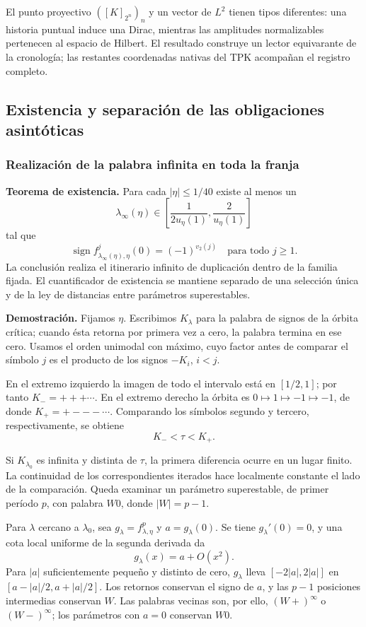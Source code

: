 El punto proyectivo \(([K]_{2^n})_n\) y un vector de \(L^2\) tienen tipos diferentes: una historia puntual induce una Dirac, mientras las amplitudes normalizables pertenecen al espacio de Hilbert. El resultado construye un lector equivarante de la cronología; las restantes coordenadas nativas del TPK acompañan el registro completo.


\subsection{Existencia y separación de las obligaciones asintóticas}
\label{hmtfg:prolongacion:6}

\subsubsection{Realización de la palabra infinita en toda la franja}
\label{hmtfg:prolongacion:6.1}

\textbf{Teorema de existencia.} Para cada \(|\eta|\le1/40\) existe al menos un
\[
\lambda_\infty(\eta)\in
\left[\frac1{2u_\eta(1)},\frac2{u_\eta(1)}\right]
\]
tal que
\[
\boxed{\operatorname{sign}f_{\lambda_\infty(\eta),\eta}^{j}(0)
=(-1)^{v_2(j)}\quad\text{para todo }j\ge1.}
\]
La conclusión realiza el itinerario infinito de duplicación dentro de la familia fijada. El cuantificador de existencia se mantiene separado de una selección única y de la ley de distancias entre parámetros superestables.

\textbf{Demostración.} Fijamos \(\eta\). Escribimos \(K_\lambda\) para la palabra de signos de la órbita crítica; cuando ésta retorna por primera vez a cero, la palabra termina en ese cero. Usamos el orden unimodal con máximo, cuyo factor antes de comparar el símbolo \(j\) es el producto de los signos \(-K_i\), \(i<j\).

En el extremo izquierdo la imagen de todo el intervalo está en \([1/2,1]\); por tanto \(K_-=+++\cdots\). En el extremo derecho la órbita es \(0\mapsto1\mapsto-1\mapsto-1\), de donde \(K_+=+---\cdots\). Comparando los símbolos segundo y tercero, respectivamente, se obtiene
\[
K_-<\tau<K_+.
\]

Si \(K_{\lambda_0}\) es infinita y distinta de \(\tau\), la primera diferencia ocurre en un lugar finito. La continuidad de los correspondientes iterados hace localmente constante el lado de la comparación. Queda examinar un parámetro superestable, de primer período \(p\), con palabra \(W0\), donde \(|W|=p-1\).

Para \(\lambda\) cercano a \(\lambda_0\), sea \(g_\lambda=f_{\lambda,\eta}^p\) y \(a=g_\lambda(0)\). Se tiene \(g_\lambda'(0)=0\), y una cota local uniforme de la segunda derivada da
\[
g_\lambda(x)=a+O(x^2).
\]
Para \(|a|\) suficientemente pequeño y distinto de cero, \(g_\lambda\) lleva \([-2|a|,2|a|]\) en \([a-|a|/2,a+|a|/2]\). Los retornos conservan el signo de \(a\), y las \(p-1\) posiciones intermedias conservan \(W\). Las palabras vecinas son, por ello, \((W+)^\infty\) o \((W-)^\infty\); los parámetros con \(a=0\) conservan \(W0\).

